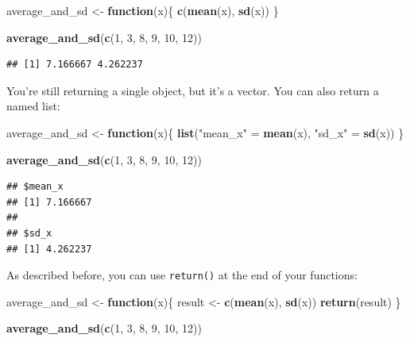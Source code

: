 \documentclass[]{gitbook}
\newenvironment{Shaded}{\begin{snugshade}}{\end{snugshade}}
\newcommand{\ControlFlowTok}[1]{\textcolor[rgb]{0.13,0.29,0.53}{\textbf{#1}}}
\newcommand{\DecValTok}[1]{\textcolor[rgb]{0.00,0.00,0.81}{#1}}
\newcommand{\KeywordTok}[1]{\textcolor[rgb]{0.13,0.29,0.53}{\textbf{#1}}}
\newcommand{\NormalTok}[1]{#1}
\newcommand{\StringTok}[1]{\textcolor[rgb]{0.31,0.60,0.02}{#1}}
\begin{document}
\begin{Shaded}
\begin{Highlighting}[]
\NormalTok{average_and_sd <-}\StringTok{ }\ControlFlowTok{function}\NormalTok{(x)\{}
\KeywordTok{c}\NormalTok{(}\KeywordTok{mean}\NormalTok{(x), }\KeywordTok{sd}\NormalTok{(x))}
\NormalTok{\}}

\KeywordTok{average_and_sd}\NormalTok{(}\KeywordTok{c}\NormalTok{(}\DecValTok{1}\NormalTok{, }\DecValTok{3}\NormalTok{, }\DecValTok{8}\NormalTok{, }\DecValTok{9}\NormalTok{, }\DecValTok{10}\NormalTok{, }\DecValTok{12}\NormalTok{))}
\end{Highlighting}
\end{Shaded}

\begin{verbatim}
## [1] 7.166667 4.262237
\end{verbatim}

You're still returning a single object, but it's a vector. You can also return a named list:

\begin{Shaded}
\begin{Highlighting}[]
\NormalTok{average_and_sd <-}\StringTok{ }\ControlFlowTok{function}\NormalTok{(x)\{}
\KeywordTok{list}\NormalTok{(}\StringTok{"mean_x"}\NormalTok{ =}\StringTok{  }\KeywordTok{mean}\NormalTok{(x), }\StringTok{"sd_x"}\NormalTok{ =}\StringTok{ }\KeywordTok{sd}\NormalTok{(x))}
\NormalTok{\}}

\KeywordTok{average_and_sd}\NormalTok{(}\KeywordTok{c}\NormalTok{(}\DecValTok{1}\NormalTok{, }\DecValTok{3}\NormalTok{, }\DecValTok{8}\NormalTok{, }\DecValTok{9}\NormalTok{, }\DecValTok{10}\NormalTok{, }\DecValTok{12}\NormalTok{))}
\end{Highlighting}
\end{Shaded}

\begin{verbatim}
## $mean_x
## [1] 7.166667
## 
## $sd_x
## [1] 4.262237
\end{verbatim}

As described before, you can use \texttt{return()} at the end of your functions:

\begin{Shaded}
\begin{Highlighting}[]
\NormalTok{average_and_sd <-}\StringTok{ }\ControlFlowTok{function}\NormalTok{(x)\{}
\NormalTok{  result <-}\StringTok{ }\KeywordTok{c}\NormalTok{(}\KeywordTok{mean}\NormalTok{(x), }\KeywordTok{sd}\NormalTok{(x))}
\KeywordTok{return}\NormalTok{(result)}
\NormalTok{\}}

\KeywordTok{average_and_sd}\NormalTok{(}\KeywordTok{c}\NormalTok{(}\DecValTok{1}\NormalTok{, }\DecValTok{3}\NormalTok{, }\DecValTok{8}\NormalTok{, }\DecValTok{9}\NormalTok{, }\DecValTok{10}\NormalTok{, }\DecValTok{12}\NormalTok{))}
\end{Highlighting}
\end{Shaded}
\end{document}
